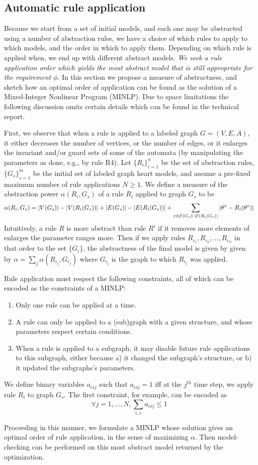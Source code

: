 \subsection{Automatic rule application}
\label{automatedApplication}

Because we start from a set of initial models, and each one may be abstracted using a number of abstraction rules, we have a choice of which rules to apply to which models, and the order in which to apply them.
Depending on which rule is applied when, we end up with different abstract models.
\emph{We seek a rule application order which yields the most abstract model that is still appropriate for the requirement $\phi$}.
In this section we propose a measure of abstractness, and sketch how an optimal order of application can be found as the solution of a Mixed-Integer Nonlinear Program (MINLP).
Due to space limitations the following discussion omits certain details which can be found in the technical report. 

First, we observe that when a rule is applied to a labeled graph $G=(V,E,A)$, it either decreases the number of vertices, or the number of edges, or it enlarges the invariant and/or guard sets of some of the automata (by manipulating the parameters as done, e.g., by rule R4).
Let $\{R_i\}_{i=1}^n$ be the set of abstraction rules, $\{G_s\}_{s=1}^m$ be the initial set of labeled graph heart models, and assume a pre-fixed maximum number of rule applications $N \geq 1$.
We define a measure of the abstraction power $\alpha(R_i,G_s)$ of a rule $R_i$ applied to graph $G_s$ to be
\[\alpha(R_i,G_s) = |V(G_s)| - |V(R_i(G_s))| + |E(G_s)| - |E(R_i(G_s))| + \sum_{x \in \mathcal{E}(G_s)\cap \mathcal{E}(R_i(G_s))}|\theta^x - R_i(\theta^x)|\] 
Intuitively, a rule $R$ is more abstract than rule $R'$ if it removes more elements of enlarges the parameter ranges more.
Then if we apply rules $R_{i_1}, R_{i_2},\ldots, R_{i_N}$ in that order to the set $\{G_i\}$, the abstractness of the final model is given by given by
$\alpha = \sum_j \alpha(R_{i_j},G_{i_j})$
where $G_{i_j}$ is the graph to which $R_{i_j}$ was applied.

Rule application must respect the following constraints, all of which can be encoded as the constraints of a MINLP:
\begin{enumerate}
	\item Only one rule can be applied at a time.
	\item A rule can only be applied to a (sub)graph with a given structure, and whose parameters respect certain conditions.
	\item When a rule is applied to a subgraph, it may disable future rule applications to this subgraph, either because a) it changed the subgraph's structure, or b) it updated the subgraphs's parameters.
\end{enumerate}
We define binary variables $a_{isj}$ such that $a_{isj} = 1$ iff at the $j^{th}$ time step, we apply rule $R_i$ to graph $G_s$.
The first constraint, for example, can be encoded as
\[\forall j=1,\ldots, N, \sum_{i,s}a_{isj} \leq 1\]

Proceeding in this manner, we formulate a MINLP whose solution gives an optimal order of rule application, in the sense of maximizing $\alpha$.
Then model-checking can be performed on this most abstract model returned by the optimization.